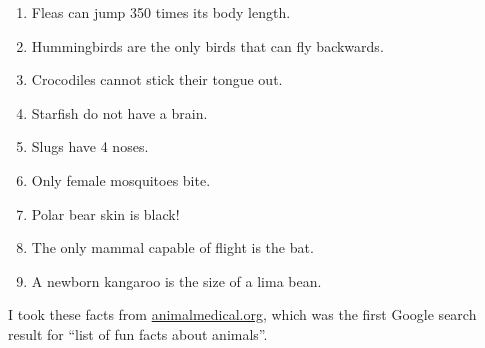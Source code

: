 \begin{enumerate}
 \item Fleas can jump 350 times its body length.
 \item Hummingbirds are the only birds that can fly backwards.
 \item Crocodiles cannot stick their tongue out.
 \item Starfish do not have a brain.
 \item Slugs have 4 noses.
 \item Only female mosquitoes bite.
 \item Polar bear skin is black!
 \item The only mammal capable of flight is the bat.
 \item A newborn kangaroo is the size of a lima bean.
\end{enumerate}

I took these facts from
\href{https://animalmedical.org/fun-facts}{animalmedical.org}, which was the
first Google search result for ``list of fun facts about animals''.
